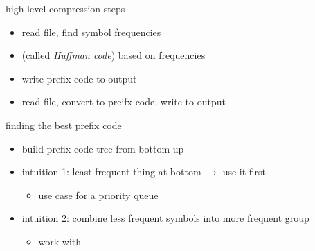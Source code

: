 \begin{frame}{high-level compression steps}
    \begin{itemize}
    \item read file, find symbol frequencies
    \item {} (called \textit{Huffman code}) based on frequencies
    \item write prefix code to output
    \item read file, convert to preifx code, write to output
    \end{itemize}
    \vspace{.5cm}
\end{frame}

\begin{frame}{finding the best prefix code}
    \begin{itemize}
    \item build prefix code tree from bottom up
    \item intuition 1: least frequent thing at bottom $\rightarrow$ use it first
        \begin{itemize}
        \item use case for a priority queue
        \end{itemize}
    \item intuition 2: combine less frequent symbols into more frequent group
        \begin{itemize}
        \item work with 
        \end{itemize}
    \end{itemize}
\end{frame}
